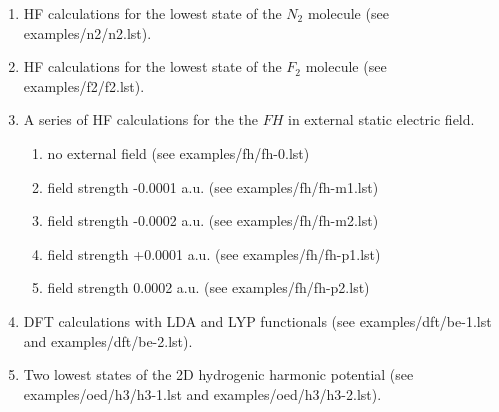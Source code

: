 \documentclass[12pt,a4paper]{article}
\begin{document}
\begin{enumerate}


\item HF calculations for the lowest state of the $N_2$ molecule (see
  examples/n2/n2.lst).




\newpage
\item HF calculations for the lowest state of the $F_2$ molecule (see
  examples/f2/f2.lst).



\newpage
\item A series of HF calculations for the the $FH$ in external static
  electric field. 

\begin{enumerate} 
\item no external field (see examples/fh/fh-0.lst)




\newpage

\item field strength -0.0001 a.u. (see examples/fh/fh-m1.lst)



\item field strength -0.0002 a.u. (see examples/fh/fh-m2.lst)



\newpage

\item field strength +0.0001 a.u. (see examples/fh/fh-p1.lst)



\item field strength 0.0002 a.u. (see examples/fh/fh-p2.lst)


\end{enumerate}

\newpage

\item DFT calculations with LDA and LYP functionals (see
  examples/\-dft/\-be-1.\-lst and examples/\-dft/\-be-2.\-lst).






\newpage

\item Two lowest states of the 2D hydrogenic harmonic potential (see
  examples/\-oed/\-h3/\-h3-1.lst and examples/\-oed/\-h3/\-h3-2.lst).


\end{enumerate}
\end{document}

